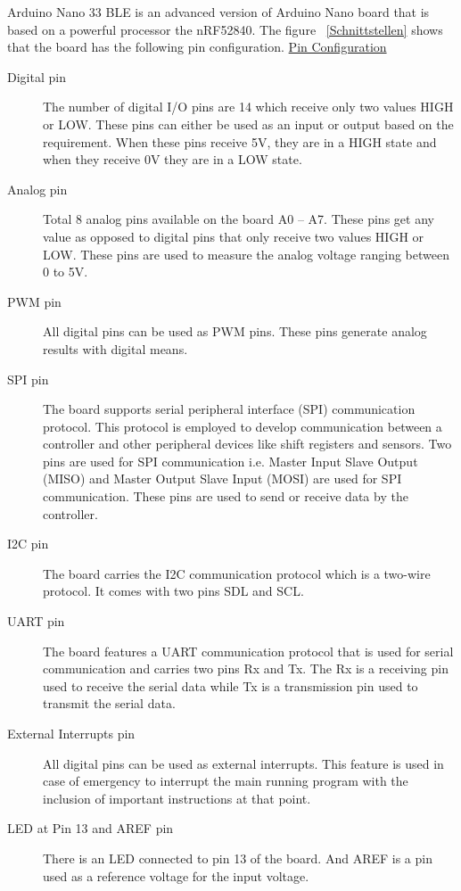 Arduino Nano 33 BLE is an advanced version of Arduino Nano board that is based on a powerful processor the nRF52840. The figure ~\ref{Schnittstellen} shows that the board has the following pin configuration. \href{https://www.etechnophiles.com/arduino-nano-33-ble-sense-pinout-introduction-specifications/}{Pin Configuration}


\begin{description}
    \item[Digital pin] The number of digital I/O pins are 14 which receive only two values HIGH or LOW. These pins can either be used as an input or output based on the requirement. When these pins receive 5V, they are in a HIGH state and when they receive 0V they are in a LOW state.
    \item[Analog pin] Total 8 analog pins available on the board A0 -- A7. These pins get any value as opposed to digital pins that only receive two values HIGH or LOW. These pins are used to measure the analog voltage ranging between 0 to 5V.
    \item[PWM pin] All digital pins can be used as PWM pins. These pins generate analog results with digital means.
    \item[SPI pin] The board supports serial peripheral interface (SPI) communication protocol. This protocol is employed to develop communication between a controller and other peripheral devices like shift registers and sensors. Two pins are used for SPI communication i.e. Master Input Slave Output (MISO) and Master Output Slave Input (MOSI) are used for SPI communication. These pins are used to send or receive data by the controller.
    \item[I2C pin] The board carries the I2C communication protocol which is a two-wire protocol. It comes with two pins SDL and SCL.
    \item[UART pin] The board features a UART communication protocol that is used for serial communication and carries two pins Rx and Tx. The Rx is a receiving pin used to receive the serial data while Tx is a transmission pin used to transmit the serial data.
    \item[External Interrupts pin] All digital pins can be used as external interrupts. This feature is used in case of emergency to interrupt the main running program with the inclusion of important instructions at that point.
    \item[LED at Pin 13 and AREF pin] There is an LED connected to pin 13 of the board. And AREF is a pin used as a reference voltage for the input voltage.
\end{description}



